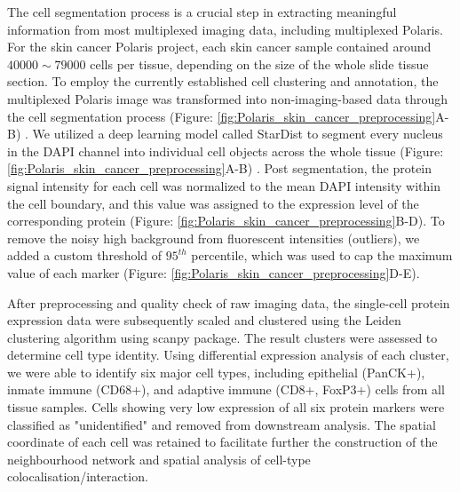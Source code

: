 The cell segmentation process is a crucial step in extracting meaningful information from most multiplexed imaging data, including multiplexed Polaris. For the skin cancer Polaris project, each skin cancer sample contained around $40000\sim 79000$ cells per tissue, depending on the size of the whole slide tissue section. To employ the currently established cell clustering and annotation, the multiplexed Polaris image was transformed into non-imaging-based data through the cell segmentation process (Figure: \ref{fig:Polaris_skin_cancer_preprocessing}A-B) \cite{hickey2021strategies}. We utilized a deep learning model called StarDist \cite{schmidt2018cell} to segment every nucleus in the DAPI channel into individual cell objects across the whole tissue (Figure: \ref{fig:Polaris_skin_cancer_preprocessing}A-B) \cite{hickey2021strategies}. Post segmentation, the protein signal intensity for each cell was normalized to the mean DAPI intensity within the cell boundary, and this value was assigned to the expression level of the corresponding protein (Figure: \ref{fig:Polaris_skin_cancer_preprocessing}B-D). To remove the noisy high background from fluorescent intensities (outliers), we added a custom threshold of $95^{th}$ percentile, which was used to cap the maximum value of each marker (Figure: \ref{fig:Polaris_skin_cancer_preprocessing}D-E). 

After preprocessing and quality check of raw imaging data, the single-cell protein expression data were subsequently scaled and clustered using the Leiden clustering algorithm using scanpy package\cite{wolf2018scanpy}. The result clusters were assessed to determine cell type identity. Using differential expression analysis of each cluster, we were able to identify six major cell types, including epithelial (PanCK+), inmate immune (CD68+), and adaptive immune (CD8+, FoxP3+) cells from all tissue samples. Cells showing very low expression of all six protein markers were classified as "unidentified" and removed from downstream analysis. The spatial coordinate of each cell was retained to facilitate further the construction of the neighbourhood network and spatial analysis of cell-type colocalisation/interaction. 

